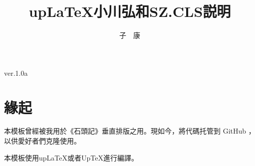 \documentclass[uplatex,a4paper,10pt]{ujarticle}
\begin{document}

\symkm

\title{\mcfamily\bfseries{up\LaTeX}{小川弘和}{SZ.CLS}{説明}}
\author{子　康}
\maketitle
\begin{center}
{\fontsize{10pt}{12}\selectfont\ttfamily
ver.1.0a
}
\end{center}
\vskip20mm



\section{緣起}
\par 本模板曾經被我用於《石頭記》垂直排版之用。現如今，將代碼托管到 GitHub ，
以供愛好者們克隆使用。
\par 本模板使用{up\LaTeX}或者{Up\TeX}進行編譯。











\end{document}
